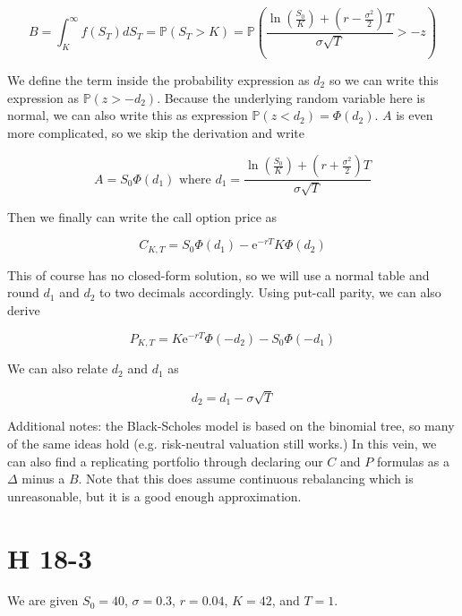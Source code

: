\documentclass[12pt, letterpaper]{article}
\newcommand{\e}{\mathrm{e}}
\renewcommand{\Pr}[1]{\mathbb{P}\left(#1\right)}
\begin{document}
    \[ B =  \int_K^\infty f(S_T) dS_T = \Pr{S_T > K} = \Pr{\frac{\ln(\frac{S_0}{K}) + \left( r - \frac{\sigma^2}{2} \right) T}{\sigma \sqrt{T}} > - z }    \]

    We define the term inside the probability expression as \(d_2\) so we can write this expression as \(\Pr{z > -d_2}\). Because the underlying random variable here is normal, we can also write this as expression \(\Pr{z < d_2} = \Phi\left(d_2\right)\). \(A\) is even more complicated, so we skip the derivation and write

    \[ A = S_0 \Phi\left(d_1\right) \text{ where } d_1 = \frac{\ln(\frac{S_0}{K}) + \left(r + \frac{\sigma^2}{2}\right) T}{\sigma \sqrt{T}}  \]

    Then we finally can write the call option price as

    \[ C_{K,T} = S_0 \Phi\left(d_1\right) - \e^{-rT} K \Phi\left( d_2 \right)  \]

    This of course has no closed-form solution, so we will use a normal table and round \(d_1\) and \(d_2\) to two decimals accordingly. Using put-call parity, we can also derive

    \[ P_{K,T} = K \e^{-rT} \Phi\left(- d_2\right) - S_0 \Phi\left(- d_1\right)  \] 

    We can also relate \(d_2\) and \(d_1\) as 

    \[ d_2 = d_1 - \sigma \sqrt{T}  \]

    Additional notes: the Black-Scholes model is based on the binomial tree, so many of the same ideas hold (e.g. risk-neutral valuation still works.) In this vein, we can also find a replicating portfolio through declaring our \(C\) and \(P\) formulas as a \(\Delta\) minus a \(B\). Note that this does assume continuous rebalancing which is unreasonable, but it is a good enough approximation. 



    \section{H 18-3}

    We are given \(S_0 = 40\), \(\sigma = 0.3\), \(r = 0.04\), \(K = 42\), and \(T = 1\).
\end{document}
